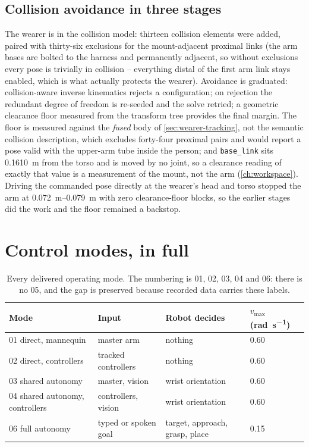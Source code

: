 \subsection{Collision avoidance in three stages}
\label{sec:clearance}

The wearer is in the collision model: thirteen collision elements were
added, paired with thirty-six exclusions for the mount-adjacent proximal
links (the arm bases are bolted to the harness and permanently adjacent, so
without exclusions every pose is trivially in collision -- everything distal
of the first arm link stays enabled, which is what actually protects the
wearer). Avoidance is graduated: collision-aware inverse kinematics rejects
a configuration; on rejection the redundant degree of freedom is re-seeded
and the solve retried; a geometric clearance floor measured from the
transform tree provides the final margin. The floor is measured against the
\emph{fused} body of \cref{sec:wearer-tracking}, not the semantic collision
description, which excludes forty-four proximal pairs and would report a
pose valid with the upper-arm tube inside the person; and
\texttt{base\_link} sits \SI{0.1610}{\metre} from the torso and is moved by
no joint, so a clearance reading of exactly that value is a measurement of
the mount, not the arm (\cref{ch:workspace}). Driving the commanded pose
directly at the wearer's head and torso stopped the arm at
\SIrange{0.072}{0.079}{\metre} with zero clearance-floor blocks, so the
earlier stages did the work and the floor remained a backstop.

\section{Control modes, in full}

\begin{table}[htbp]
  \centering
  \small
  \caption{Every delivered operating mode. The numbering is 01, 02, 03, 04
  and 06: there is no 05, and the gap is preserved because recorded data
  carries these labels.}
  \label{tab:modes}
  \begin{tabular}{@{}llll@{}}
    \toprule
    Mode & Input & Robot decides & $v_{\max}$ (\si{\radian\per\second}) \\
    \midrule
    01 direct, mannequin & master arm & nothing & 0.60 \\
    02 direct, controllers & tracked controllers & nothing & 0.60 \\
    03 shared autonomy & master, vision & wrist orientation & 0.60 \\
    04 shared autonomy, controllers & controllers, vision & wrist orientation & 0.60 \\
    06 full autonomy & typed or spoken goal & target, approach, grasp, place & 0.15 \\
    \bottomrule
  \end{tabular}
\end{table}

